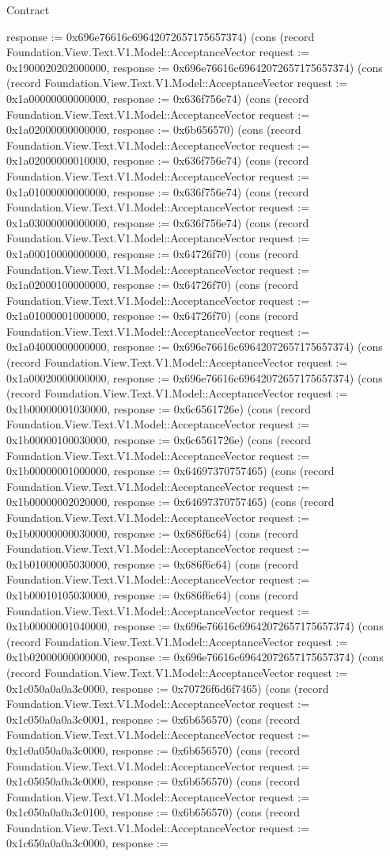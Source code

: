 \begin{lexlean}{Contract}
\begin{semanticmodule}
{response := 0x696e76616c69642072657175657374}) (cons (record Foundation.View.Text.V1.Model::AcceptanceVector {request := 0x1900020202000000, response := 0x696e76616c69642072657175657374}) (cons (record Foundation.View.Text.V1.Model::AcceptanceVector {request := 0x1a00000000000000, response := 0x636f756e74}) (cons (record Foundation.View.Text.V1.Model::AcceptanceVector {request := 0x1a02000000000000, response := 0x6b656570}) (cons (record Foundation.View.Text.V1.Model::AcceptanceVector {request := 0x1a02000000010000, response := 0x636f756e74}) (cons (record Foundation.View.Text.V1.Model::AcceptanceVector {request := 0x1a01000000000000, response := 0x636f756e74}) (cons (record Foundation.View.Text.V1.Model::AcceptanceVector {request := 0x1a03000000000000, response := 0x636f756e74}) (cons (record Foundation.View.Text.V1.Model::AcceptanceVector {request := 0x1a00010000000000, response := 0x64726f70}) (cons (record Foundation.View.Text.V1.Model::AcceptanceVector {request := 0x1a02000100000000, response := 0x64726f70}) (cons (record Foundation.View.Text.V1.Model::AcceptanceVector {request := 0x1a01000001000000, response := 0x64726f70}) (cons (record Foundation.View.Text.V1.Model::AcceptanceVector {request := 0x1a04000000000000, response := 0x696e76616c69642072657175657374}) (cons (record Foundation.View.Text.V1.Model::AcceptanceVector {request := 0x1a00020000000000, response := 0x696e76616c69642072657175657374}) (cons (record Foundation.View.Text.V1.Model::AcceptanceVector {request := 0x1b00000001030000, response := 0x6c6561726e}) (cons (record Foundation.View.Text.V1.Model::AcceptanceVector {request := 0x1b00000100030000, response := 0x6c6561726e}) (cons (record Foundation.View.Text.V1.Model::AcceptanceVector {request := 0x1b00000001000000, response := 0x64697370757465}) (cons (record Foundation.View.Text.V1.Model::AcceptanceVector {request := 0x1b00000002020000, response := 0x64697370757465}) (cons (record Foundation.View.Text.V1.Model::AcceptanceVector {request := 0x1b00000000030000, response := 0x686f6c64}) (cons (record Foundation.View.Text.V1.Model::AcceptanceVector {request := 0x1b01000005030000, response := 0x686f6c64}) (cons (record Foundation.View.Text.V1.Model::AcceptanceVector {request := 0x1b00010105030000, response := 0x686f6c64}) (cons (record Foundation.View.Text.V1.Model::AcceptanceVector {request := 0x1b00000001040000, response := 0x696e76616c69642072657175657374}) (cons (record Foundation.View.Text.V1.Model::AcceptanceVector {request := 0x1b02000000000000, response := 0x696e76616c69642072657175657374}) (cons (record Foundation.View.Text.V1.Model::AcceptanceVector {request := 0x1c050a0a0a3c0000, response := 0x70726f6d6f7465}) (cons (record Foundation.View.Text.V1.Model::AcceptanceVector {request := 0x1c050a0a0a3c0001, response := 0x6b656570}) (cons (record Foundation.View.Text.V1.Model::AcceptanceVector {request := 0x1c0a050a0a3c0000, response := 0x6b656570}) (cons (record Foundation.View.Text.V1.Model::AcceptanceVector {request := 0x1c05050a0a3c0000, response := 0x6b656570}) (cons (record Foundation.View.Text.V1.Model::AcceptanceVector {request := 0x1c050a0a0a3c0100, response := 0x6b656570}) (cons (record Foundation.View.Text.V1.Model::AcceptanceVector {request := 0x1c650a0a0a3c0000, response := }
\end{semanticmodule}
\end{lexlean}
